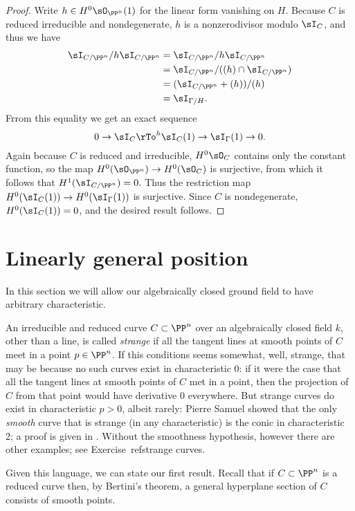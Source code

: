 \begin{proof}
Write $h\in H^0\sO_{\PP^n}(1)$ for the linear form vanishing on $H$.
Because $C$ is reduced irreducible and nondegenerate,
$h$ is a nonzerodivisor modulo $\sI_C$, and thus
we have 
$$
\begin{aligned}
\sI_{C/\PP^n}/h\sI_{C/\PP^n} &= \sI_{C/\PP^n}/h\sI_{C/\PP^n} \\
&= \sI_{C/\PP^n}/((h)\cap\sI_{C/\PP^n})\\
 &=(\sI_{C/\PP^n}+(h))/(h)\\
 &= \sI_{\Gamma/H}.
\end{aligned}
 $$
 Frrom this equality we get an exact sequence
 $$
0\to \sI_C \rTo^h \sI_C(1)\to \sI_\Gamma(1)\to 0.
$$
Again because $C$ is reduced and irreducible, $H^0\sO_C$ contains only the constant function, so the map $H^0(\sO_{\PP^n}) \to H^0(\sO_C)$ is surjective, 
from which it follows that $H^1(\sI_{C/\PP^n}) = 0.$ 
Thus the restriction map $H^0(\sI_C(1))\to H^0(\sI_\Gamma(1))$ is surjective. Since
$C$ is nondegenerate, $H^0(\sI_C(1)) = 0$, and the desired result follows.
\end{proof}


\section{Linearly general position}
In this section we will allow our algebraically closed ground field to have arbitrary characteristic. 

An irreducible and reduced curve
$C\subset \PP^n$ over an algebraically closed field $k$, other than a line, is called \emph{strange} if
all the tangent lines at smooth points of $C$ meet in a point $p\in \PP^n$. If this conditions seems somewhat, well, strange, that may be because no such curves exist in characteristic 0: if it were the case that all the tangent lines at smooth points of $C$ met in a point, then the projection of $C$ from that point would have derivative 0 everywhere. But strange curves do exist in characteristic $p > 0$, albeit rarely: Pierre Samuel showed that the only \emph{smooth} curve that is strange (in any characteristic) is the conic in characteristic 2; a proof is given in \cite[Theorem IV.3.9]{Hartshorne1977}. Without the smoothness hypothesis, however there are other examples; see Exercise~ref{strange curves}.

Given this language, we can state our first result. Recall that if $C\subset \PP^n$ is a reduced curve then, by Bertini's theorem, a general hyperplane
section of $C$ consists of smooth points. 

